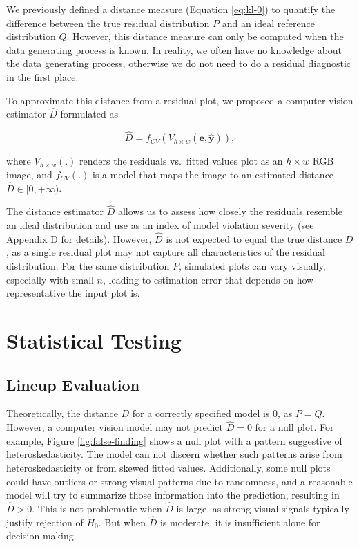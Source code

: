\documentclass[]{interact}
\theoremstyle{plain}%
\theoremstyle{definition}
\theoremstyle{remark}
\begin{document}
We previously defined a distance measure (Equation \ref{eq:kl-0}) to
quantify the difference between the true residual distribution \(P\) and
an ideal reference distribution \(Q\). However, this distance measure
can only be computed when the data generating process is known. In
reality, we often have no knowledge about the data generating process,
otherwise we do not need to do a residual diagnostic in the first place.

To approximate this distance from a residual plot, we proposed a
computer vision estimator \(\hat{D}\) formulated as

\begin{equation*} \label{eq:d-approx}
\hat{D} = f_{CV}(V_{h \times w}(\boldsymbol{e}, \hat{\boldsymbol{y}})),
\end{equation*}

\noindent where \(V_{h \times w}(.)\) renders the residuals vs.~fitted
values plot as an \(h \times w\) RGB image, and \(f_{CV}(.)\) is a model
that maps the image to an estimated distance
\(\hat{D} \in [0, +\infty)\).

The distance estimator \(\hat{D}\) allows us to assess how closely the
residuals resemble an ideal distribution and use as an index of model
violation severity (see Appendix D for details). However, \(\hat{D}\) is
not expected to equal the true distance \(D\), as a single residual plot
may not capture all characteristics of the residual distribution. For
the same distribution \(P\), simulated plots can vary visually,
especially with small \(n\), leading to estimation error that depends on
how representative the input plot is.

\section{Statistical Testing}\label{sec-model-statistical-testing}

\subsection{Lineup Evaluation}\label{sec-model-lineup-evaluation}

Theoretically, the distance \(D\) for a correctly specified model is
\(0\), as \(P = Q\). However, a computer vision model may not predict
\(\hat{D} = 0\) for a null plot. For example, Figure
\ref{fig:false-finding} shows a null plot with a pattern suggestive of
heteroskedasticity. The model can not discern whether such patterns
arise from heteroskedasticity or from skewed fitted values.
Additionally, some null plots could have outliers or strong visual
patterns due to randomness, and a reasonable model will try to summarize
those information into the prediction, resulting in \(\hat{D} > 0\).
This is not problematic when \(\hat{D}\) is large, as strong visual
signals typically justify rejection of \(H_0\). But when \(\hat{D}\) is
moderate, it is insufficient alone for decision-making.
\end{document}
